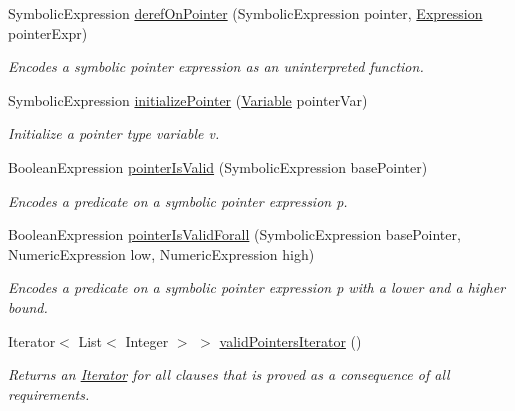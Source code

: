\begin{DoxyCompactItemize}
Symbolic\+Expression \hyperlink{classedu_1_1udel_1_1cis_1_1vsl_1_1civl_1_1semantics_1_1contract_1_1CommonContractConditionGenerator_a5e4dcfb2aacdc50962f5d3a0ee3eb081}{deref\+On\+Pointer} (Symbolic\+Expression pointer, \hyperlink{interfaceedu_1_1udel_1_1cis_1_1vsl_1_1civl_1_1model_1_1IF_1_1expression_1_1Expression}{Expression} pointer\+Expr)
\begin{DoxyCompactList}\small\item\em Encodes a symbolic pointer expression as an uninterpreted function. \end{DoxyCompactList}\item 
Symbolic\+Expression \hyperlink{classedu_1_1udel_1_1cis_1_1vsl_1_1civl_1_1semantics_1_1contract_1_1CommonContractConditionGenerator_aa0ddbb742f7cf526d6ba299d8ac874c5}{initialize\+Pointer} (\hyperlink{interfaceedu_1_1udel_1_1cis_1_1vsl_1_1civl_1_1model_1_1IF_1_1variable_1_1Variable}{Variable} pointer\+Var)
\begin{DoxyCompactList}\small\item\em Initialize a pointer type variable v. \end{DoxyCompactList}\item 
Boolean\+Expression \hyperlink{classedu_1_1udel_1_1cis_1_1vsl_1_1civl_1_1semantics_1_1contract_1_1CommonContractConditionGenerator_ade21f9d246ca4247be795b330de2fa72}{pointer\+Is\+Valid} (Symbolic\+Expression base\+Pointer)
\begin{DoxyCompactList}\small\item\em Encodes a  predicate on a symbolic pointer expression p. \end{DoxyCompactList}\item 
Boolean\+Expression \hyperlink{classedu_1_1udel_1_1cis_1_1vsl_1_1civl_1_1semantics_1_1contract_1_1CommonContractConditionGenerator_a0e29d756b19f1936b7e425c6d2fcabbf}{pointer\+Is\+Valid\+Forall} (Symbolic\+Expression base\+Pointer, Numeric\+Expression low, Numeric\+Expression high)
\begin{DoxyCompactList}\small\item\em Encodes a  predicate on a symbolic pointer expression p with a lower and a higher bound. \end{DoxyCompactList}\item 
Iterator$<$ List$<$ Integer $>$ $>$ \hyperlink{classedu_1_1udel_1_1cis_1_1vsl_1_1civl_1_1semantics_1_1contract_1_1CommonContractConditionGenerator_ad71c756c882ae18665e40ecfa58c3d7f}{valid\+Pointers\+Iterator} ()
\begin{DoxyCompactList}\small\item\em Returns an \hyperlink{}{Iterator} for all  clauses that is proved as a consequence of all requirements. \end{DoxyCompactList}\end{DoxyCompactItemize}
